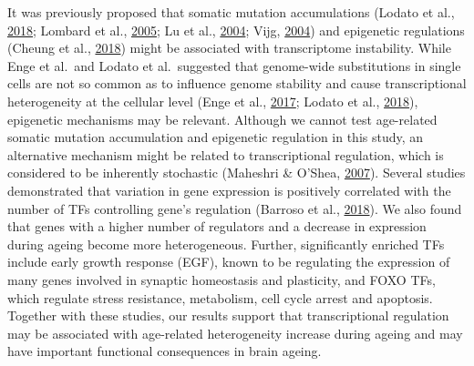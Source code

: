 \documentclass[12pt,twoside]{unicam}
\begin{document}
It was previously proposed that somatic mutation accumulations (Lodato et al., \protect\hyperlink{ref-Lodato2018}{2018}; Lombard et al., \protect\hyperlink{ref-Lombard2005}{2005}; Lu et al., \protect\hyperlink{ref-Lu2004}{2004}; Vijg, \protect\hyperlink{ref-Vijg2004}{2004}) and epigenetic regulations (Cheung et al., \protect\hyperlink{ref-Cheung2018}{2018}) might be associated with transcriptome instability. While Enge et al.~and Lodato et al.~suggested that genome-wide substitutions in single cells are not so common as to influence genome stability and cause transcriptional heterogeneity at the cellular level (Enge et al., \protect\hyperlink{ref-Enge2017}{2017}; Lodato et al., \protect\hyperlink{ref-Lodato2018}{2018}), epigenetic mechanisms may be relevant. Although we cannot test age-related somatic mutation accumulation and epigenetic regulation in this study, an alternative mechanism might be related to transcriptional regulation, which is considered to be inherently stochastic (Maheshri \& O'Shea, \protect\hyperlink{ref-Maheshri2007}{2007}). Several studies demonstrated that variation in gene expression is positively correlated with the number of TFs controlling gene's regulation (Barroso et al., \protect\hyperlink{ref-Barroso2018}{2018}). We also found that genes with a higher number of regulators and a decrease in expression during ageing become more heterogeneous. Further, significantly enriched TFs include early growth response (EGF), known to be regulating the expression of many genes involved in synaptic homeostasis and plasticity, and FOXO TFs, which regulate stress resistance, metabolism, cell cycle arrest and apoptosis. Together with these studies, our results support that transcriptional regulation may be associated with age-related heterogeneity increase during ageing and may have important functional consequences in brain ageing.
\end{document}

